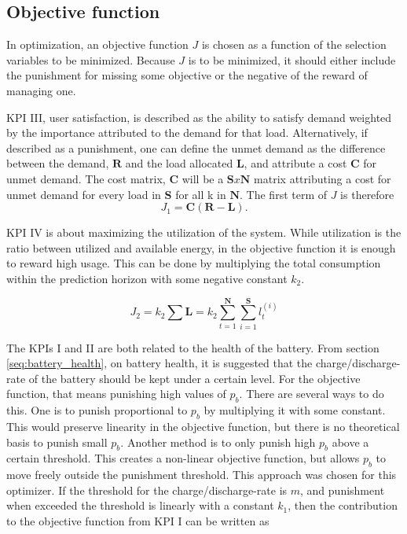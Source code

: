 \subsection{Objective function}
In optimization, an objective function $J$ is chosen as a function of the selection variables to be minimized. Because $J$ is to be minimized, it should either include the punishment for missing some objective or the negative of the reward of managing one. 

KPI III, user satisfaction, is described as the ability to satisfy demand weighted by the importance attributed to the demand for that load. Alternatively, if described as a punishment, one can define the unmet demand as the difference between the demand, $\mathbf{R}$ and the load allocated $\mathbf{L}$, and attribute a cost $\mathbf{C}$ for unmet demand. The cost matrix, $\mathbf{C}$ will be a $\mathbf{S}x\mathbf{N}$ matrix attributing a cost for unmet demand for every load in $\mathbf{S}$ for all k in $\mathbf{N}$. The first term of $J$ is therefore\\

\begin{equation}
    J_1    =   \mathbf{C}(\mathbf{R}-\mathbf{L}).
    \label{eq:J1}
\end{equation}

KPI IV is about maximizing the utilization of the system. While utilization is the ratio between utilized and available energy, in the objective function it is enough to reward high usage. This can be done by multiplying the total consumption within the prediction horizon with some negative constant $\mathit{k_2}$.

\begin{equation}
    J_2 = k_2\sum\mathbf{L} = k_2\sum_{t=1}^{\mathbf{N}} \sum_{i=1}^{\mathbf{S}} l_t^{(i)}
\end{equation}

The KPIs I and II are both related to the health of the battery. From section \ref{seq:battery_health}, on battery health, it is suggested that the charge/discharge-rate of the battery should be kept under a certain level. For the objective function, that means punishing high values of $p_b$. There are several ways to do this. One is to punish proportional to $p_b$ by multiplying it with some constant. This would preserve linearity in the objective function, but there is no theoretical basis to punish small $p_b$. Another method is to only punish high $p_b$ above a certain threshold. This creates a non-linear objective function, but allows $p_b$ to move freely outside the punishment threshold. This approach was chosen for this optimizer. If the threshold for the charge/discharge-rate is $m$, and punishment when exceeded the threshold is linearly with a constant $k_1$, then the contribution to the objective function from KPI I can be written as

